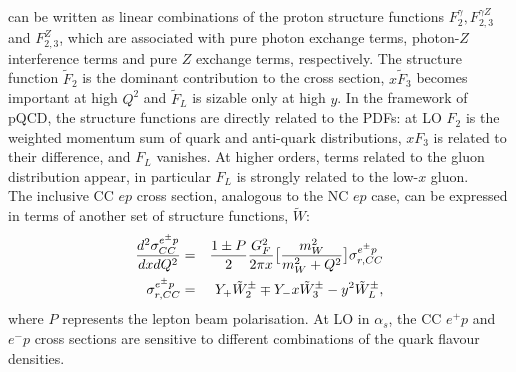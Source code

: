 can be written as linear combinations of the proton structure functions $F^{\gamma}_2, F^{\gamma Z}_{2,3}$ 
and $F^Z_{2,3}$, which are associated with pure photon exchange terms, photon-$Z$ interference
terms and pure $Z$ exchange terms, respectively. 
The structure function $\tilde F_2$ is the dominant contribution to the cross section, 
$x \tilde F_3$ becomes important at high $Q^2$ and $\tilde F_L$ is sizable 
only at high $y$. 
In the framework of pQCD, the structure functions are directly related to the 
PDFs: at LO $F_2$ is the weighted momentum sum of quark and anti-quark distributions, 
 $xF_3$ is related to their difference, 
and $F_L$ vanishes. At higher orders, terms related to the gluon distribution
appear, in particular $F_L$ is strongly related to the low-$x$ 
gluon.
\\
The inclusive CC $ep$ cross section, analogous to the NC $ep$ case, can be expressed in terms of another set 
of structure functions, $\tilde W$: 
\begin{eqnarray}
\centering
   \frac{d^2\sigma_{CC}^{e^{\pm} p}}{dxdQ^2}&=&\frac{1\pm P}{2}\frac{G^2_F}{2\pi x}\big [\frac{m^2_W}{m^2_W+Q^2}\big ]\sigma_{r,CC}^{e^{\pm} p}\\
   \sigma_{r,CC}^{e^{\pm} p}&= &  Y_{+} \tilde W_2^{\pm} \mp Y_{-}x \tilde W_3^{\pm} - y^2 \tilde W_L^{\pm},
\end{eqnarray}
where $P$ represents the lepton beam polarisation.
At LO in $\alpha_s$, the CC $e^+p$ and $e^-p$ cross sections are sensitive to 
different combinations of the quark flavour densities.

